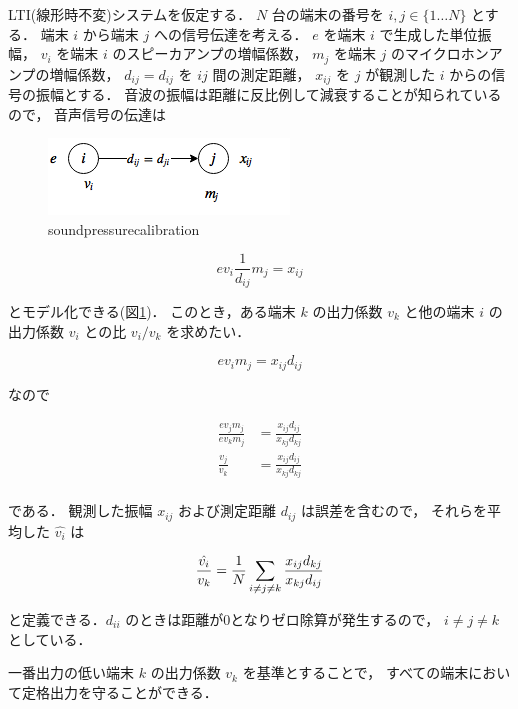 LTI(線形時不変)システムを仮定する．
$N$ 台の端末の番号を $i,j \in \{1\dots N\}$ とする．
端末 $i$ から端末 $j$ への信号伝達を考える．
$e$ を端末 $i$ で生成した単位振幅，
$v_i$ を端末 $i$ のスピーカアンプの増幅係数，
$m_j$ を端末 $j$ のマイクロホンアンプの増幅係数，
$d_{ij}=d_{ij}$ を $ij$ 間の測定距離，
$x_{ij}$ を $j$ が観測した $i$ からの信号の振幅とする．
音波の振幅は距離に反比例して減衰することが知られているので，
音声信号の伝達は

\begin{figure}[p]\centering
  \hspace{-2mm}\includegraphics[clip,width=1.1\hsize]{img/sound_pressure_calibration.png}
  \caption{soundpressurecalibration}\label{fig:soundpressurecalibration}
\end{figure}

$$
e v_i \frac{1}{d_{ij}} m_j = x_{ij}
$$

とモデル化できる(図\ref{fig:soundpressurecalibration})．
このとき，ある端末 $k$ の出力係数 $v_k$ と他の端末 $i$ の出力係数 $v_i$ との比 $v_i/v_k$ を求めたい．

$$
e v_i m_j = x_{ij}d_{ij}
$$

なので

$$\begin{aligned}
\frac{e v_j m_j}{e v_k m_j} &= \frac{x_{ij} d_{ij}}{x_{kj} d_{kj}} \\
\frac{v_j}{v_k} &= \frac{x_{ij} d_{ij}}{x_{kj}d_{kj}} \\
\end{aligned}$$

である．
観測した振幅 $x_{ij}$ および測定距離 $d_{ij}$ は誤差を含むので，
それらを平均した $\hat{v_i}$ は

$$
\frac{\hat{v_i}}{v_k} = \frac{1}{N} \sum_{i\neq j \neq k} \frac{x_{ij} d_{kj}}{x_{kj}d_{ij}} \\
$$

と定義できる．$d_{ii}$ のときは距離が0となりゼロ除算が発生するので，
$i\neq j \neq k$ としている．

一番出力の低い端末 $k$ の出力係数 $v_k$ を基準とすることで，
すべての端末において定格出力を守ることができる．

